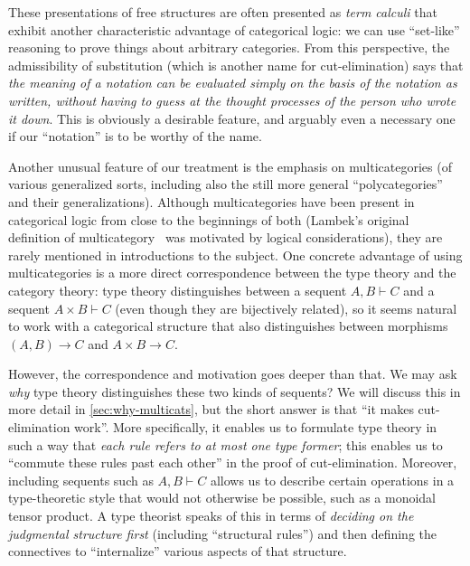 \documentclass{book}
\let\types\vdash
\begin{document}
These presentations of free structures are often presented as \emph{term calculi} that exhibit another characteristic advantage of categorical logic: we can use ``set-like'' reasoning to prove things about arbitrary categories.
From this perspective, the admissibility of substitution (which is another name for cut-elimination) says that \emph{the meaning of a notation can be evaluated simply on the basis of the notation as written, without having to guess at the thought processes of the person who wrote it down}.
This is obviously a desirable feature, and arguably even a necessary one if our ``notation'' is to be worthy of the name.

Another unusual feature of our treatment is the emphasis on multicategories (of various generalized sorts, including also the still more general ``polycategories'' and their generalizations).
Although multicategories have been present in categorical logic from close to the beginnings of both (Lambek's original definition of multicategory~\cite{lambek:dedsys-ii} was motivated by logical considerations), they are rarely mentioned in introductions to the subject.
One concrete advantage of using multicategories is a more direct correspondence between the type theory and the category theory: type theory distinguishes between a sequent $A,B\types C$ and a sequent $A\times B\types C$ (even though they are bijectively related), so it seems natural to work with a categorical structure that also distinguishes between morphisms $(A,B)\to C$ and $A\times B\to C$.

However, the correspondence and motivation goes deeper than that.
We may ask \emph{why} type theory distinguishes these two kinds of sequents?
We will discuss this in more detail in \cref{sec:why-multicats}, but the short answer is that ``it makes cut-elimination work''.
More specifically, it enables us to formulate type theory in such a way that \emph{each rule refers to at most one type former}; this enables us to ``commute these rules past each other'' in the proof of cut-elimination.
Moreover, including sequents such as $A,B\types C$ allows us to describe certain operations in a type-theoretic style that would not otherwise be possible, such as a monoidal tensor product.
A type theorist speaks of this in terms of \emph{deciding on the judgmental structure first} (including ``structural rules'') and then defining the connectives to ``internalize'' various aspects of that structure.
\end{document}
